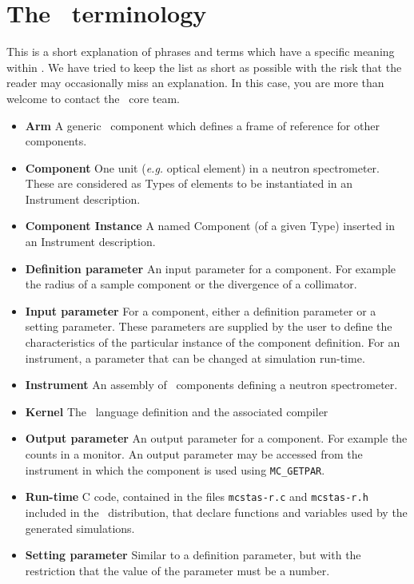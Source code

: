 
\chapter{The \MCX\ terminology}
\label{s:terminology}

This is a short explanation of phrases and terms which have a specific
meaning within \MCX. We have tried to keep the list as short
as possible with the risk that the reader may occasionally miss
an explanation. In this case, you are more than welcome to contact
the \MCX\ core team.

\noindent
\begin{itemize}
\item{\bfseries Arm}  A generic \MCX\ component which defines a frame of reference
      for other components.
\item{\bfseries Component} One unit ({\em e.g.} optical element) in a neutron
      spectrometer. These are considered as Types of elements to be instantiated in an Instrument description.
\item{\bfseries Component Instance} A named Component (of a given Type) inserted in an Instrument description.
\item{\bfseries Definition parameter} An input parameter for a component. For
  example the radius of a sample component or the divergence of a collimator.
\item{\bfseries Input parameter} For a component, either a definition parameter
or a setting parameter. These parameters are supplied by the user to
define the characteristics of the particular instance of the component
definition. For an instrument, a parameter that can be changed at
simulation run-time.
\item{\bfseries Instrument} An assembly of \MCX\ components defining
      a neutron spectrometer.
\item{\bfseries Kernel} The \MCX\ language definition and the associated compiler
\item{\bfseries Output parameter} An output parameter for a component.
  For example the counts in a monitor. An output parameter may be
  accessed from the instrument in which the component is used using
  \verb`MC_GETPAR`.
\item{\bfseries Run-time} C code, contained in the files
  \verb+mcstas-r.c+ and \verb+mcstas-r.h+ included in the \MCX\
  distribution, that declare functions and variables used by the
  generated simulations.
\item{\bfseries Setting parameter} Similar to a definition parameter, but with the
  restriction that the value of the parameter must be a number.
\end{itemize}

